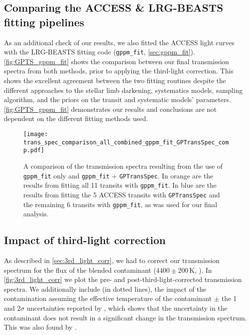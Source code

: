 \documentclass[twocolumn]{aastex63}
\newcommand{\gppmfit}{\texttt{gppm\_fit}}
\begin{document}
\subsection{Comparing the ACCESS \& LRG-BEASTS fitting pipelines}
\label{sec:wb_comparing_GPTS_to_gppm_fit}

As an additional check of our results, we also fitted the ACCESS light curves with the LRG-BEASTS fitting code (\gppmfit{}, \autoref{sec:gppm_fit}). \autoref{fig:GPTS_gppm_fit} shows the comparison between our final transmission spectra from both methods, prior to applying the third-light correction. This shows the excellent agreement between the two fitting routines despite the different approaches to the stellar limb darkening, systematics models, sampling algorithm, and the priors on the transit and systematic models' parameters. \autoref{fig:GPTS_gppm_fit} demonstrates our results and conclusions are not dependent on the different fitting methods used. 

\begin{figure}
    \centering
    \texttt{[image: trans\_spec\_comparison\_all\_combined\_gppm\_fit\_GPTransSpec\_comp.pdf]}
    \caption{A comparison of the transmission spectra resulting from the use of \gppmfit{} only and \gppmfit{} + \texttt{GPTransSpec}. In orange are the results from fitting all 11 transits with \gppmfit{}. In blue are the results from fitting the 5 ACCESS transits with \texttt{GPTransSpec} and the remaining 6 transits with \gppmfit{}, as was used for our final analysis.}
    \label{fig:GPTS_gppm_fit}
\end{figure}

\subsection{Impact of third-light correction}

As described in \autoref{sec:3rd_light_corr}, we had to correct our transmission spectrum for the flux of the blended contaminant ($4400 \pm 200$\,K, \citealt{Cartier2017}). In \autoref{fig:3rd_light_corr} we plot the pre- and post-third-light-corrected transmission spectra. We additionally include (in dotted lines), the impact of the contamination assuming the effective temperature of the contaminant $\pm$ the 1 and 2$\sigma$ uncertainties reported by \cite{Cartier2017}, which shows that the uncertainty in the contaminant does not result in a significant change in the transmission spectrum. This was also found by \cite{Lendl2017}.
\end{document}

